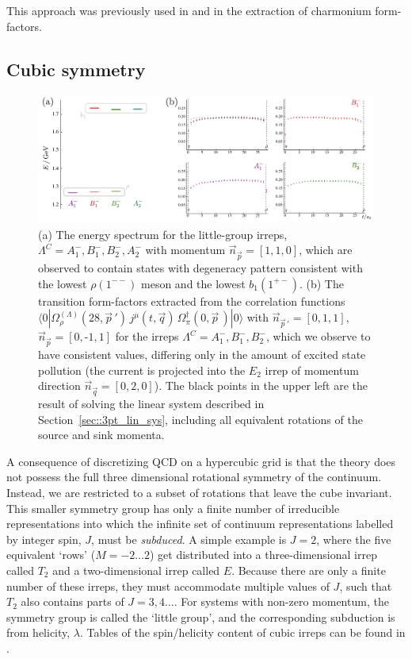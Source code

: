 \documentclass[twocolumn,amsmath,amssymb,prd,10pt,floatfix, 
superscriptaddress,nofootinbib, showpacs, preprintnumbers]{revtex4-1}
\begin{document}
This approach was previously used in \cite{Dudek:2006ej} and \cite{PhysRevD.79.094504} in the extraction of charmonium form-factors. 




\subsection{Cubic symmetry \label{ssec::three_points_cub_sym}}

\begin{figure}
\includegraphics[width=\linewidth]{fig9.pdf}
\caption{
(a) The energy spectrum for the little-group irreps, $\Lambda^C = A_1^-,B_1^-,B_2^-,A_2^-$  with momentum $\vec{n}_{\vec{p}} = [1,1,0]$, which are observed to contain states with degeneracy pattern consistent with the lowest $\rho(1^{--})$ meson and the lowest $b_1(1^{+-})$. (b) The transition form-factors extracted from the correlation functions $\langle 0 | \Omega^{(\Lambda)}_{\rho}(28,\vec{p}\,') \, j^\mu(t,\vec{q}) \, \Omega_\pi^\dagger(0,\vec{p}\,) | 0 \rangle$ with $\vec{n}_{\vec{p}\,'} = [0,1,1]$, $\vec{n}_{\vec{p}} = [0,\text{-1},1]$ for the irreps $\Lambda^C = A_1^-,B_1^-,B_2^-$, which we observe to have consistent values, differing only in the amount of excited state pollution (the current is projected into the $E_2$ irrep of momentum direction  $\vec{n}_{\vec{q}} = [0,2,0]$). The black points in the upper left are the result of solving the linear system described in Section~\ref{sec::3pt_lin_sys}, including all equivalent rotations of the source and sink momenta.
\label{fig::restoration_of_rotational_symmetry}}
\end{figure}


A consequence of discretizing QCD on a hypercubic grid is that the theory does not possess the full three dimensional rotational symmetry of the continuum. Instead, we are restricted to a subset of rotations that leave the cube invariant. This smaller symmetry group has only a finite number of irreducible representations into which the infinite set of continuum representations labelled by integer spin, $J$, must be \emph{subduced}. A simple example is $J=2$, where the five equivalent `rows' ($M=-2 \ldots 2$) get distributed into a three-dimensional irrep called $T_2$ and a two-dimensional irrep called $E$. Because there are only a finite number of these irreps, they must accommodate multiple values of $J$, such that $T_2$ also contains parts of $J=3,4\ldots$. For systems with non-zero momentum, the symmetry group is called the `little group', and the corresponding subduction is from helicity, $\lambda$. Tables of the spin/helicity content of cubic irreps can be found in \cite{Thomas:2011rh}.
\end{document}
